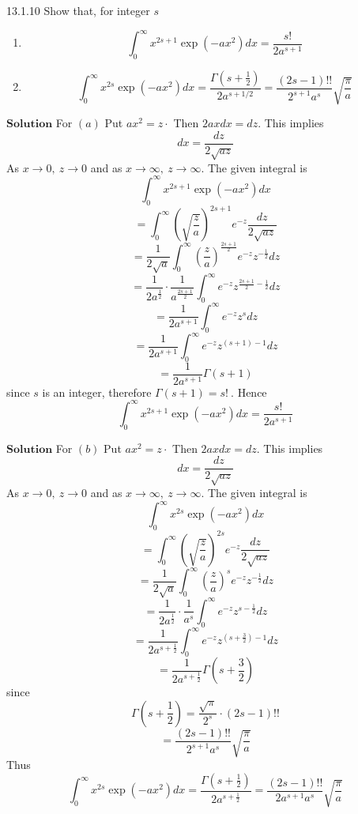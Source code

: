 \newpage

\begin{mybox}{13.1.10}
Show that, for integer $s$
\begin{enumerate}[$(a)$]
\item $$\int_{0}^{\infty} x^{2 s+1} \exp \left(-a x^{2}\right) d x=\frac{s!}{2 a^{s+1}}$$
\item $$\int_{0}^{\infty} x^{2 s} \exp \left(-a x^{2}\right) d x=\frac{\Gamma\left(s+\frac{1}{2}\right)}{2 a^{s+1 / 2}}=\frac{(2 s-1) ! !}{2^{s+1} a^{s}} \sqrt{\frac{\pi}{a}}$$
\end{enumerate}


\end{mybox}
$\boxed{\textbf{Solution}}$ For $(a)$ Put $a x^{2}=z \cdot$ Then $2 a x d x=d z$. This implies
$$
d x=\frac{d z}{2 \sqrt{a z}}
$$
As $x \rightarrow 0, \  z \rightarrow 0$ and as $x \rightarrow \infty, \  z \rightarrow \infty$.
The given integral is
$$
\int_{0}^{\infty} x^{2 s+1} \exp \left(-a x^{2}\right) d x
$$
$$
=\int_{0}^{\infty}\left(\sqrt{\frac{z}{a}}\right)^{2 s+1} e^{-z} \frac{d z}{2 \sqrt{a z}}
$$
$$
=\frac{1}{2 \sqrt{a}} \int_{0}^{\infty}\left(\frac{z}{a}\right)^{\frac{2 s+1}{2}} e^{-z} z^{-\frac{1}{2}} d z
$$
$$
=\frac{1}{2 a^{\frac{1}{2}}} \cdot \frac{1}{a^{\frac{2 s+1}{2}}} \int_{0}^{\infty} e^{-z} z^{\frac{2 s+1}{2}-\frac{1}{2}} d z
$$
$$
=\frac{1}{2 a^{s+1}} \int_{0}^{\infty} e^{-z} z^{s} d z
$$
$$
=\frac{1}{2 a^{s+1}} \int_{0}^{\infty} e^{-z} z^{(s+1)-1} d z
$$
$$
=\frac{1}{2 a^{s+1}} \Gamma(s+1)
$$
since $s$ is an integer, therefore $\Gamma(s+1)=s! \ $. Hence 
$$\int_{0}^{\infty} x^{2 s+1} \exp \left(-a x^{2}\right) d x=\frac{s!}{2 a^{s+1}}$$ 

$\boxed{\textbf{Solution}}$ For $(b)$ Put $a x^{2}=z \cdot$ Then $2 a x d x=d z$. This implies
$$
d x=\frac{d z}{2 \sqrt{a z}}
$$
As $x \rightarrow 0, \  z \rightarrow 0$ and as $x \rightarrow \infty, \  z \rightarrow \infty$.
The given integral is
$$
\int_{0}^{\infty} x^{2 s} \exp \left(-a x^{2}\right) d x
$$
$$
=\int_{0}^{\infty}\left(\sqrt{\frac{z}{a}}\right)^{2 s} e^{-z} \frac{d z}{2 \sqrt{a z}}
$$
$$
=\frac{1}{2 \sqrt{a}} \int_{0}^{\infty}\left(\frac{z}{a}\right)^{s} e^{-z} z^{-\frac{1}{2}} d z
$$
$$
=\frac{1}{2 a^{\frac{1}{2}}} \cdot \frac{1}{a^{s}} \int_{0}^{\infty} e^{-z} z^{s-\frac{1}{2}} d z
$$
$$
=\frac{1}{2 a^{s+\frac{1}{2}}} \int_{0}^{\infty} e^{-z} z^{\left(s+\frac{3}{2}\right)-1} d z
$$
$$
=\frac{1}{2 a^{s+\frac{1}{2}}} \Gamma\left(s+\frac{3}{2}\right)
$$
since 
$$\Gamma\left(s+\frac{1}{2}\right)=\frac{\sqrt{\pi}}{2^{s}} \cdot(2 s-1) ! !$$
$$
=\frac{(2 s-1) ! !}{2^{s+1} a^{s}} \sqrt{\frac{\pi}{a}}
$$
Thus
$$
\int_{0}^{\infty} x^{2 s} \exp \left(-a x^{2}\right) d x=\frac{\Gamma\left(s+\frac{1}{2}\right)}{2 a^{s+\frac{1}{2}}}=\frac{(2 s-1) ! !}{2 a^{s+1} a^{s}} \sqrt{\frac{\pi}{a}}
$$

